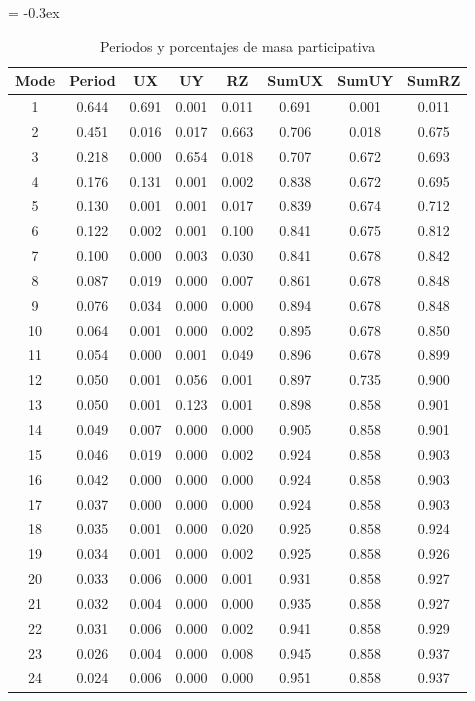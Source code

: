 \documentclass{article}%
\begin{document}
\begin{table}[h!]%
\extrarowheight = -0.3ex%
\renewcommand{\arraystretch}{1.3}%
\centering%
\caption{Periodos y porcentajes de masa participativa}%
\begin{tabular}{cccccccc}
\toprule
Mode & Period & UX & UY & RZ & SumUX & SumUY & SumRZ \\
\midrule
1 & 0.644 & 0.691 & 0.001 & 0.011 & 0.691 & 0.001 & 0.011 \\
2 & 0.451 & 0.016 & 0.017 & 0.663 & 0.706 & 0.018 & 0.675 \\
3 & 0.218 & 0.000 & 0.654 & 0.018 & 0.707 & 0.672 & 0.693 \\
4 & 0.176 & 0.131 & 0.001 & 0.002 & 0.838 & 0.672 & 0.695 \\
5 & 0.130 & 0.001 & 0.001 & 0.017 & 0.839 & 0.674 & 0.712 \\
6 & 0.122 & 0.002 & 0.001 & 0.100 & 0.841 & 0.675 & 0.812 \\
7 & 0.100 & 0.000 & 0.003 & 0.030 & 0.841 & 0.678 & 0.842 \\
8 & 0.087 & 0.019 & 0.000 & 0.007 & 0.861 & 0.678 & 0.848 \\
9 & 0.076 & 0.034 & 0.000 & 0.000 & 0.894 & 0.678 & 0.848 \\
10 & 0.064 & 0.001 & 0.000 & 0.002 & 0.895 & 0.678 & 0.850 \\
11 & 0.054 & 0.000 & 0.001 & 0.049 & 0.896 & 0.678 & 0.899 \\
12 & 0.050 & 0.001 & 0.056 & 0.001 & 0.897 & 0.735 & 0.900 \\
13 & 0.050 & 0.001 & 0.123 & 0.001 & 0.898 & 0.858 & 0.901 \\
14 & 0.049 & 0.007 & 0.000 & 0.000 & 0.905 & 0.858 & 0.901 \\
15 & 0.046 & 0.019 & 0.000 & 0.002 & 0.924 & 0.858 & 0.903 \\
16 & 0.042 & 0.000 & 0.000 & 0.000 & 0.924 & 0.858 & 0.903 \\
17 & 0.037 & 0.000 & 0.000 & 0.000 & 0.924 & 0.858 & 0.903 \\
18 & 0.035 & 0.001 & 0.000 & 0.020 & 0.925 & 0.858 & 0.924 \\
19 & 0.034 & 0.001 & 0.000 & 0.002 & 0.925 & 0.858 & 0.926 \\
20 & 0.033 & 0.006 & 0.000 & 0.001 & 0.931 & 0.858 & 0.927 \\
21 & 0.032 & 0.004 & 0.000 & 0.000 & 0.935 & 0.858 & 0.927 \\
22 & 0.031 & 0.006 & 0.000 & 0.002 & 0.941 & 0.858 & 0.929 \\
23 & 0.026 & 0.004 & 0.000 & 0.008 & 0.945 & 0.858 & 0.937 \\
24 & 0.024 & 0.006 & 0.000 & 0.000 & 0.951 & 0.858 & 0.937 \\
\bottomrule
\end{tabular}
%
\end{table}
\end{document}
